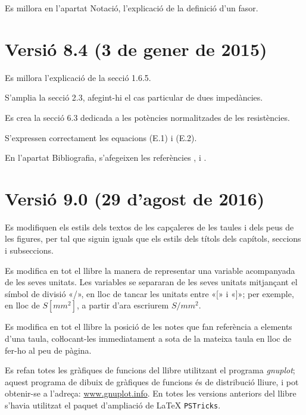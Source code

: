 Es millora en l'apartat Notació, l'explicació de la definició d'un fasor.


\section*{Versió 8.4 (3 de gener de 2015)}

Es millora l'explicació de la secció 1.6.5.

S'amplia la secció 2.3, afegint-hi el cas particular de dues impedàncies.

Es crea la secció 6.3 dedicada a les potències normalitzades de les resistències.

S'expressen correctament les equacions (E.1) i (E.2).

En l'apartat Bibliografia, s'afegeixen les referències \cite{AGVS}, \cite{JSch} i \cite{RRop}.


\section*{Versió 9.0 (29 d’agost de 2016)}

Es modifiquen els estils dels textos de les capçaleres de les taules i dels peus de les figures, per tal que siguin iguals que els estils dels títols dels capítols, seccions i subseccions.

Es modifica en tot el llibre la manera de representar una variable acompanyada de les seves unitats. Les variables se separaran de les seves unitats mitjançant el símbol de divisió «/», en lloc de tancar les unitats entre «[» i  «]»; per exemple, en lloc de $S\unit{[mm^2]}$, a partir d'ara escriurem $S/\unit{mm^2}$.

Es modifica en tot el llibre la posició de les notes que fan referència a elements d'una taula, coŀlocant-les immediatament a sota de la mateixa taula en lloc de fer-ho al peu de pàgina.

Es refan totes les gràfiques de funcions del llibre utilitzant el programa \emph{gnuplot}; aquest programa de dibuix de gràfiques de funcions és de distribució lliure, i pot obtenir-se a l'adreça: \href{http://www.gnuplot.info/}{www.gnuplot.info}. En totes les versions anteriors del llibre s'havia utilitzat el paquet d'ampliació de \LaTeX{} \texttt{PSTricks}.

